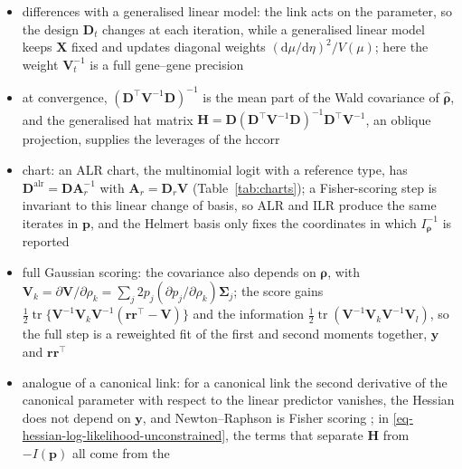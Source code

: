 \begin{itemize}
  \item differences with a generalised linear model: the link acts on the parameter, so the design \(\boldsymbol{D}_{t}\)
        changes at each iteration, while a generalised linear model keeps \(\boldsymbol{X}\) fixed and updates diagonal weights
        \((\mathrm{d}\mu/\mathrm{d}\eta)^{2}/V(\mu)\); here the weight \(\boldsymbol{V}_{t}^{-1}\) is a full gene--gene precision
  \item at convergence, \((\boldsymbol{D}^{\top}\boldsymbol{V}^{-1}\boldsymbol{D})^{-1}\) is the mean part of the Wald covariance of \(\hat{\boldsymbol{\rho}}\), and the
        generalised hat matrix \(\boldsymbol{H}=\boldsymbol{D}(\boldsymbol{D}^{\top}\boldsymbol{V}^{-1}\boldsymbol{D})^{-1}\boldsymbol{D}^{\top}\boldsymbol{V}^{-1}\), an oblique projection, supplies the
        leverages of the \gls{hccorr}
  \item chart: an ALR chart, the multinomial logit with a reference type, has \(\boldsymbol{D}^{\mathrm{alr}}=\boldsymbol{D}\boldsymbol{A}_{r}^{-1}\) with
        \(\boldsymbol{A}_{r}=\boldsymbol{D}_{r}\mathbf{V}\) (Table~\ref{tab:charts}); a Fisher-scoring step is invariant to this linear change of
        basis, so ALR and ILR produce the same iterates in \(\boldsymbol{p}\), and the Helmert basis only fixes the
        coordinates in which \(I_{\boldsymbol{\rho}}^{-1}\) is reported
  \item full Gaussian scoring: the covariance also depends on \(\boldsymbol{\rho}\), with
        \(\boldsymbol{V}_{k}=\partial\boldsymbol{V}/\partial\rho_{k}=\sum_{j}2p_{j}(\partial p_{j}/\partial\rho_{k})\boldsymbol{\Sigma}_{j}\); the score gains
        \(\tfrac12\operatorname{tr}\{\boldsymbol{V}^{-1}\boldsymbol{V}_{k}\boldsymbol{V}^{-1}(\boldsymbol{r}\boldsymbol{r}^{\top}-\boldsymbol{V})\}\) and the information
        \(\tfrac12\operatorname{tr}(\boldsymbol{V}^{-1}\boldsymbol{V}_{k}\boldsymbol{V}^{-1}\boldsymbol{V}_{l})\), so the full step is a reweighted fit of the first and second
        moments together, \(\boldsymbol{y}\) and \(\boldsymbol{r}\boldsymbol{r}^{\top}\)
  \item analogue of a canonical link: for a canonical link the second derivative of the canonical parameter
        with respect to the linear predictor vanishes, the Hessian does not depend on \(\boldsymbol{y}\), and Newton--Raphson is
        Fisher scoring \cite[Sect.~4.5.5]{agrestiFoundationsLinearGeneralized2015} \cite[Sect.~2.2]{nelderGeneralizedLinearModels1972};
        in \eqref{eq-hessian-log-likelihood-unconstrained}, the terms that separate \(\mathbf{H}\) from \(-I(\boldsymbol{p})\) all come from the

\end{itemize}
